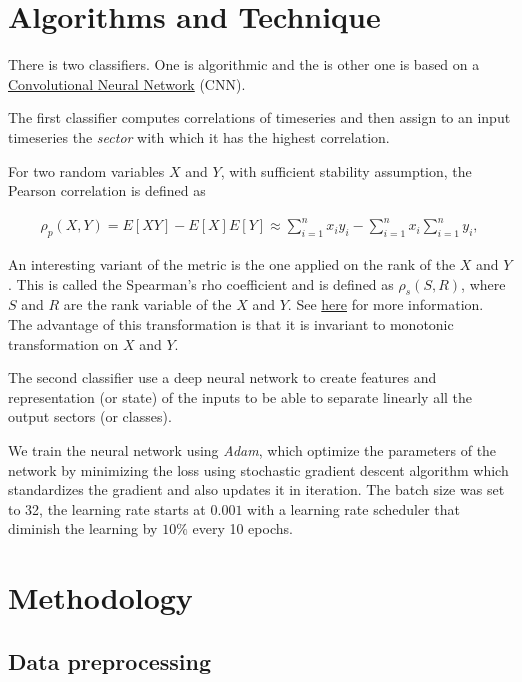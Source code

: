 \documentclass[a4paper,twoside]{article}
\begin{document}
\section{Algorithms and Technique}
\label{sec:orga558eb8}

There is two classifiers. One is algorithmic and the is other one is based on
a \href{http://colah.github.io/posts/2014-07-Understanding-Convolutions/}{Convolutional Neural Network} (CNN). 

The first classifier computes correlations of timeseries and then assign to an
input timeseries the \emph{sector} with which it has the highest correlation. 

For two random variables \(X\) and \(Y\), with sufficient stability assumption, the
Pearson correlation is defined as

\begin{align*}
  \rho_p(X, Y) = E[XY] - E[X]E[Y] \approx \sum_{i=1}^n x_iy_i - \sum_{i=1}^nx_i\sum_{i=1}^n y_i,
\end{align*}

An interesting variant of the metric is the one applied on the rank of the \(X\)
and \(Y\). This is called the Spearman's rho coefficient and is defined as
\(\rho_s(S, R)\), where \(S\) and \(R\) are the rank variable of the \(X\) and \(Y\).
See \href{https://en.wikipedia.org/wiki/Spearman\%27s\_rank\_correlation\_coefficient}{here} for more information. The advantage of this transformation is that it
is invariant to monotonic transformation on \(X\) and \(Y\).

The second classifier use a deep neural network to create features and
representation (or state) of the inputs to be able to separate linearly all
the output sectors (or classes).

We train the neural network using \emph{Adam}, which optimize the parameters of the
network by minimizing the loss using stochastic gradient descent algorithm
which standardizes the gradient and also updates it in iteration. The batch
size was set to 32, the learning rate starts at \(0.001\) with a learning rate
scheduler that diminish the learning by \(10\%\) every 10 epochs.

\section{Methodology}
\label{sec:org6bf7dbd}

\subsection{Data preprocessing}
\label{sec:org06293d3}
\end{document}
